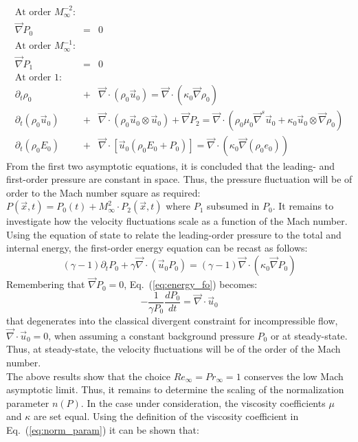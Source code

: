 \documentclass[preprint,10pt]{elsarticle}
\renewcommand{\div}{\vec{\nabla}\! \cdot \!}
\newcommand{\grad}{\vec{\nabla}}
\newcommand{\eqt}[1]{Eq.~(\ref{#1})}                     %
\begin{document}
\begin{itemize}
 \begin{eqnarray}\label{eq:asympt_equ1}
 \text{At order $M_{\infty}^{-2}$:} && \nonumber\\
 \grad P_0 &=& 0  \nonumber\\
 \text{At order $M_{\infty}^{-1}$:} && \nonumber\\
 \grad P_1 &=& 0  \nonumber \\
 \text{At order $1$:} && \nonumber\\
 \partial_t \rho_0 &+& \div ( \rho_0 \vec{u}_0 ) = \div ( \kappa_0 \grad \rho_0 ) \nonumber \\
 \partial_t (\rho_0 \vec{u}_0) &+& \div ( \rho_0 \vec{u}_0 \otimes \vec{u}_0) + \grad P_2 = \div (\rho_0 \mu_0 \grad^s \vec{u}_0 + \kappa_0 \vec{u}_0 \otimes \grad \rho_0 ) \nonumber \\
 \partial_t(\rho_0 E_0) &+& \div \left[ \vec{u}_0 (\rho_0 E_0 + P_0) \right] = \div(\kappa_0 \grad(\rho_0 e_0)) \nonumber
 \end{eqnarray}
From the first two asymptotic equations, it is concluded that the leading- and first-order pressure are constant in space. Thus, the pressure fluctuation will be of order to the Mach number square as required: $P(\vec{x},t) = P_0(t) + M_{\infty}^2 \cdot P_2(\vec{x},t)$ where $P_1$ subsumed in $P_0$. It remains to investigate how the velocity fluctuations scale as a function of the Mach number. Using the equation of state to relate the leading-order pressure to the total and internal energy, the first-order energy equation can be recast as follows: 
\begin{equation}\label{eq:energy_fo}
 (\gamma-1) \partial_tP_0 + \gamma \div \left( \vec{u}_0 P_0\right) = (\gamma-1)\div(\kappa_0 \grad P_0)
\end{equation}
Remembering that $\grad P_0 = 0$,  \eqt{eq:energy_fo} becomes:
\begin{equation}\label{eq:divu0}
-\frac{1}{\gamma P_0}\frac{dP_0}{dt} = \div \vec{u}_0
\end{equation}
that degenerates into the classical divergent constraint for incompressible flow, $\div \vec{u}_0 = 0$, when assuming a constant background pressure $P_0$ or at steady-state. Thus, at steady-state, the velocity fluctuations will be of the order of the Mach number. \\
The above results show that the choice $Re_{\infty} = Pr_{\infty} = 1$ conserves the low Mach asymptotic limit. Thus, it remains to determine the scaling of the normalization parameter $n(P)$. In the case under consideration, the viscosity coefficients $\mu$ and $\kappa$ are set equal. Using the definition of the viscosity coefficient in \eqt{eq:norm_param} it can be shown that:

\end{itemize}
\end{document}
